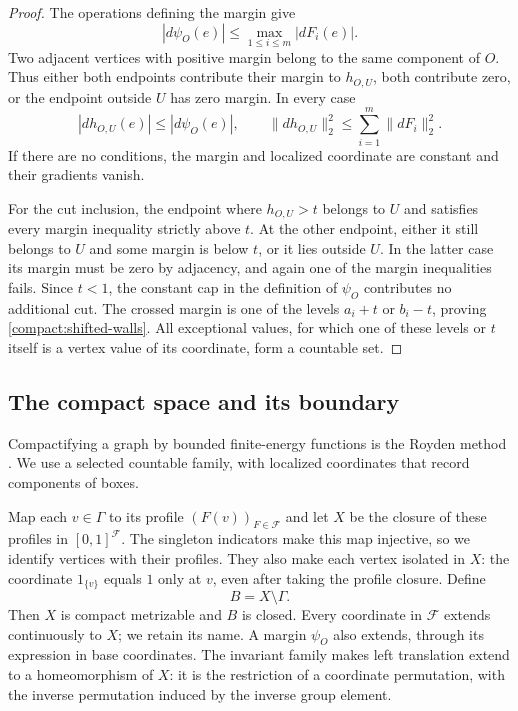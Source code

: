 \begin{proof}
The operations defining the margin give
\[
 |d\psi_O(e)|\le\max_{1\le i\le m}|dF_i(e)|.
\]
Two adjacent vertices with positive margin belong to the same
component of $O$.  Thus either both endpoints contribute their margin
to $h_{O,U}$, both contribute zero, or the endpoint outside $U$ has
zero margin.  In every case
\[
 |dh_{O,U}(e)|\le |d\psi_O(e)|,
 \qquad \|dh_{O,U}\|_2^2\le\sum_{i=1}^m\|dF_i\|_2^2.
\]
If there are no conditions, the margin and localized coordinate are
constant and their gradients vanish.

For the cut inclusion, the endpoint where $h_{O,U}>t$ belongs to $U$
and satisfies every margin inequality strictly above $t$.  At the
other endpoint, either it still belongs to $U$ and some margin is
below $t$, or it lies outside $U$.  In the latter case its margin must
be zero by adjacency, and again one of the margin inequalities fails.
Since $t<1$, the constant cap in the definition of $\psi_O$ contributes
no additional cut.  The crossed margin is one of the levels
$a_i+t$ or $b_i-t$, proving \eqref{compact:shifted-walls}.  All
exceptional values, for which one of these levels or $t$ itself is a
vertex value of its coordinate, form a countable set.
\end{proof}

\subsection{The compact space and its boundary}

Compactifying a graph by bounded finite-energy functions is the Royden
method \cite[Section~4]{KellerLenzSchmidtWojciechowski2017}. We use a
selected countable family, with localized coordinates that record
components of boxes.

Map each $v\in\Gamma$ to its profile $(F(v))_{F\in\mathcal F}$ and
let $X$ be the closure of these profiles in $[0,1]^{\mathcal F}$.  The
singleton indicators make this map injective, so we identify vertices
with their profiles.  They also make each vertex isolated in $X$:
the coordinate $1_{\{v\}}$ equals $1$ only at $v$, even after taking
the profile closure.  Define
\[
 B=X\setminus\Gamma.
\]
Then $X$ is compact metrizable and $B$ is closed.  Every coordinate in
$\mathcal F$ extends continuously to $X$; we retain its name.  A margin
$\psi_O$ also extends, through its expression in base coordinates.
The invariant family makes left translation extend to a homeomorphism
of $X$: it is the restriction of a coordinate permutation, with the
inverse permutation induced by the inverse group element.

